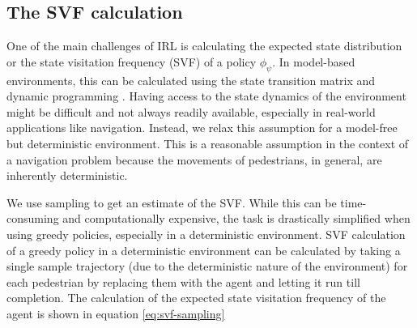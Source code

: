 \subsection{The SVF calculation}
One of the main challenges of IRL is calculating the expected state distribution or the state visitation frequency (SVF) of a policy $\phi_{\psi}$. In model-based environments, this can be calculated using the state transition matrix and dynamic programming \cite{wulfmeier2015maximum}. Having access to the state dynamics of the environment might be difficult and not always readily available, especially in real-world applications like navigation. Instead, we relax this assumption for a model-free but deterministic environment. This is a reasonable assumption in the context of a navigation problem because the movements of pedestrians, in general, are inherently deterministic. %

We use sampling to get an estimate of the SVF. While this can be time-consuming and computationally expensive, the task is drastically simplified when using greedy policies, especially in a deterministic environment. SVF calculation of a greedy policy in a deterministic environment can be calculated by taking a single sample trajectory (due to the deterministic nature of the environment) for each pedestrian by replacing them with the agent and letting it run till completion. The calculation of the expected state visitation frequency of the agent is shown in equation \autoref{eq:svf-sampling}

